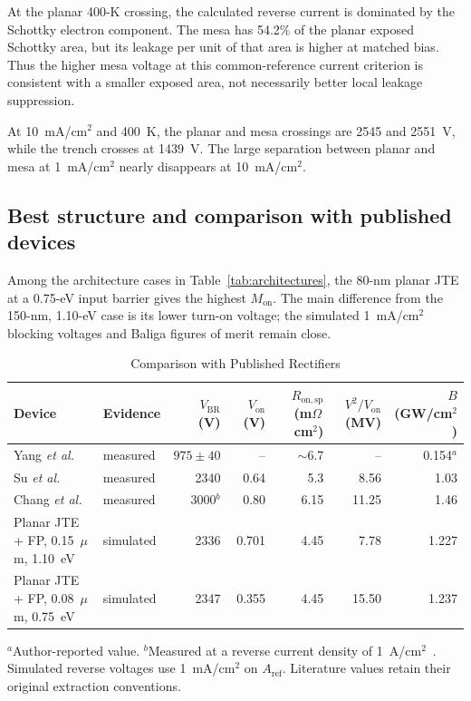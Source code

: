 \documentclass[journal,10pt]{IEEEtran}
\newcommand{\Ron}{\ensuremath{R_{\mathrm{on,sp}}}}
\begin{document}
At the planar 400-K crossing, the calculated reverse current is dominated by the Schottky electron component. The mesa has 54.2\% of the planar exposed Schottky area, but its leakage per unit of that area is higher at matched bias. Thus the higher mesa voltage at this common-reference current criterion is consistent with a smaller exposed area, not necessarily better local leakage suppression.

At 10~mA/cm$^2$ and 400~K, the planar and mesa crossings are 2545 and 2551~V, while the trench crosses at 1439~V. The large separation between planar and mesa at 1~mA/cm$^2$ nearly disappears at 10~mA/cm$^2$.
\subsection{Best structure and comparison with published devices}
Among the architecture cases in Table~\ref{tab:architectures}, the 80-nm planar JTE at a 0.75-eV input barrier gives the highest $M_{\mathrm{on}}$. The main difference from the 150-nm, 1.10-eV case is its lower turn-on voltage; the simulated 1~mA/cm$^2$ blocking voltages and Baliga figures of merit remain close.

\begin{table}[!ht]
\caption{Comparison with Published Rectifiers}
\label{tab:literature}
\centering\scriptsize
\setlength{\tabcolsep}{2.2pt}
\begin{tabular}{>{\raggedright\arraybackslash}p{2.1cm}lrrrrr}
\toprule
Device & Evidence & $V_{\mathrm{BR}}$ (V) & $V_{\mathrm{on}}$ (V) & $\Ron$ (m$\Omega$\,cm$^2$) & $V^2/V_{\mathrm{on}}$ (MV) & $B$ (GW/cm$^2$)\\
\midrule
Yang \emph{et al.}~\cite{Yang2017} & measured & $975\pm40$ & -- & $\sim$6.7 & -- & 0.154$^{a}$\\
Su \emph{et al.}~\cite{Su2024_APL} & measured & 2340 & 0.64 & 5.3 & 8.56 & 1.03\\
Chang \emph{et al.}~\cite{Chang2025_APL} & measured & 3000$^{b}$ & 0.80 & 6.15 & 11.25 & 1.46\\
Planar JTE + FP, 0.15~$\mu$m, 1.10~eV & simulated & 2336 & 0.701 & 4.45 & 7.78 & 1.227\\
Planar JTE + FP, 0.08~$\mu$m, 0.75~eV & simulated & 2347 & 0.355 & 4.45 & 15.50 & 1.237\\
\bottomrule
\end{tabular}
\par\smallskip\begin{minipage}{0.98\columnwidth}\footnotesize
$^{a}$Author-reported value. $^{b}$Measured at a reverse current density of 1~A/cm$^2$~\cite{Chang2025_APL}. Simulated reverse voltages use 1~mA/cm$^2$ on $A_{\mathrm{ref}}$. Literature values retain their original extraction conventions.
\end{minipage}
\end{table}
\end{document}
